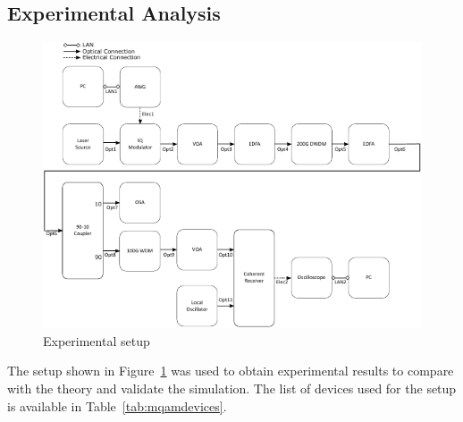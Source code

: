 \begin{refsection}
\subsection{Experimental Analysis}
\begin{figure}[H]
	\centering
	\includegraphics[width=\textwidth]{./sdf/m_qam_system/figures/mqamExperimental20180321.pdf}
	\caption{Experimental setup}
	\label{fig:experimental_mqam_setup}
\end{figure}

The setup shown in Figure~\ref{fig:experimental_mqam_setup} was used to obtain experimental results to compare with the theory and validate the simulation. The list of devices used for the setup is available in Table~\ref{tab:mqamdevices}.



\end{refsection}
